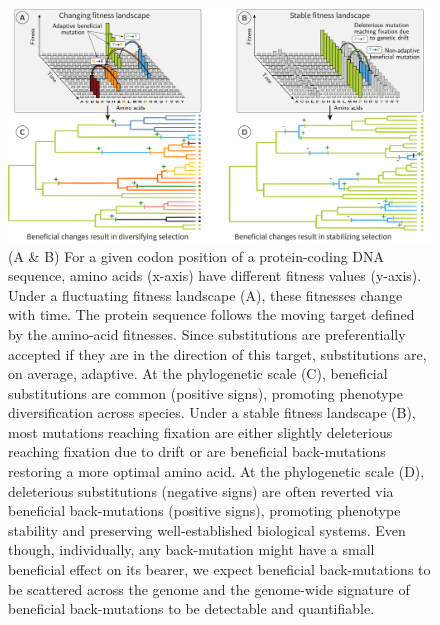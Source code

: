 \documentclass[12pt]{article}
\begin{document}
\begin{figure}[!ht]
    \centering
    \includegraphics[width=\textwidth, page=1] {artworks/figure.fitness-landscape}
    \caption{
        (A \& B) For a given codon position of a protein-coding DNA sequence, amino acids (x-axis) have different fitness values (y-axis).
        Under a fluctuating fitness landscape (A), these fitnesses change with time.
        The protein sequence follows the moving target defined by the amino-acid fitnesses. Since substitutions are preferentially accepted if they are in the direction of this target, substitutions are, on average, adaptive.
        At the phylogenetic scale (C), beneficial substitutions are common (positive signs), promoting phenotype diversification across species.
        Under a stable fitness landscape (B), most mutations reaching fixation are either slightly deleterious reaching fixation due to drift or are beneficial back-mutations restoring a more optimal amino acid.
        At the phylogenetic scale (D), deleterious substitutions (negative signs) are often reverted via beneficial back-mutations (positive signs), promoting phenotype stability and preserving well-established biological systems.
        Even though, individually, any back-mutation might have a small beneficial effect on its bearer, we expect beneficial back-mutations to be scattered across the genome and the genome-wide signature of beneficial back-mutations to be detectable and quantifiable.}
    \label{fig:fitness-landscape}
\end{figure}
\end{document}
